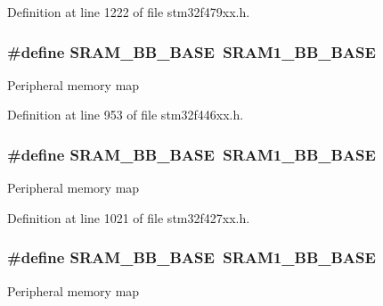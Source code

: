 Definition at line 1222 of file stm32f479xx.\+h.

\subsubsection[{\texorpdfstring{S\+R\+A\+M\+\_\+\+B\+B\+\_\+\+B\+A\+SE}{SRAM_BB_BASE}}]{\setlength{\rightskip}{0pt plus 5cm}\#define S\+R\+A\+M\+\_\+\+B\+B\+\_\+\+B\+A\+SE~{\bf S\+R\+A\+M1\+\_\+\+B\+B\+\_\+\+B\+A\+SE}}\hypertarget{group___peripheral__memory__map_gad3548b6e2f017f39d399358f3ac98454}{}\label{group___peripheral__memory__map_gad3548b6e2f017f39d399358f3ac98454}
Peripheral memory map 

Definition at line 953 of file stm32f446xx.\+h.

\subsubsection[{\texorpdfstring{S\+R\+A\+M\+\_\+\+B\+B\+\_\+\+B\+A\+SE}{SRAM_BB_BASE}}]{\setlength{\rightskip}{0pt plus 5cm}\#define S\+R\+A\+M\+\_\+\+B\+B\+\_\+\+B\+A\+SE~{\bf S\+R\+A\+M1\+\_\+\+B\+B\+\_\+\+B\+A\+SE}}\hypertarget{group___peripheral__memory__map_gad3548b6e2f017f39d399358f3ac98454}{}\label{group___peripheral__memory__map_gad3548b6e2f017f39d399358f3ac98454}
Peripheral memory map 

Definition at line 1021 of file stm32f427xx.\+h.

\subsubsection[{\texorpdfstring{S\+R\+A\+M\+\_\+\+B\+B\+\_\+\+B\+A\+SE}{SRAM_BB_BASE}}]{\setlength{\rightskip}{0pt plus 5cm}\#define S\+R\+A\+M\+\_\+\+B\+B\+\_\+\+B\+A\+SE~{\bf S\+R\+A\+M1\+\_\+\+B\+B\+\_\+\+B\+A\+SE}}\hypertarget{group___peripheral__memory__map_gad3548b6e2f017f39d399358f3ac98454}{}\label{group___peripheral__memory__map_gad3548b6e2f017f39d399358f3ac98454}
Peripheral memory map 


